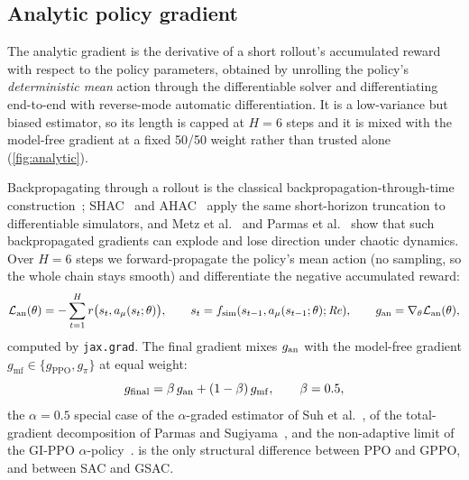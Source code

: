 \subsection{Analytic policy gradient}
\label{sec:analytic}

The analytic gradient is the derivative of a short rollout's accumulated
reward with respect to the policy parameters, obtained by unrolling the
policy's \emph{deterministic mean} action through the differentiable solver
and differentiating end-to-end with reverse-mode automatic differentiation.
It is a low-variance but biased estimator, so its length is capped at
$H=6$ steps and it is mixed with the model-free gradient at a fixed 50/50
weight rather than trusted alone (\cref{fig:analytic}).

Backpropagating through a rollout is the classical
backpropagation-through-time construction~\cite{werbos1990bptt}; SHAC~\cite{shac2022}
and AHAC~\cite{ahac2024} apply the same short-horizon truncation to
differentiable simulators, and Metz et al.~\cite{metz2021} and Parmas et
al.~\cite{parmas2018pipps} show that such backpropagated gradients can
explode and lose direction under chaotic dynamics. Over $H=6$ steps we
forward-propagate the policy's mean action (no sampling, so the whole chain
stays smooth) and differentiate the negative accumulated reward:
\begin{equation}
  \mathcal{L}_{\mathrm{an}}(\theta)=-\sum_{t=1}^{H}r\big(s_t,a_\mu(s_t;\theta)\big),\qquad
  s_t=f_{\mathrm{sim}}(s_{t-1},a_\mu(s_{t-1};\theta);\mathit{Re}),\qquad
  g_{\mathrm{an}}=\nabla_\theta\mathcal{L}_{\mathrm{an}}(\theta),
  \label{eq:analytic}
\end{equation}
computed by \texttt{jax.grad}. The final gradient mixes $g_{\mathrm{an}}$ with the
model-free gradient $g_{\mathrm{mf}}\in\{g_{\mathrm{PPO}},g_\pi\}$ at equal
weight:
\begin{equation}
  g_{\mathrm{final}}=\beta\,g_{\mathrm{an}}+(1-\beta)\,g_{\mathrm{mf}},\qquad \beta=0.5,
  \label{eq:mix}
\end{equation}
the $\alpha=0.5$ special case of the $\alpha$-graded estimator of Suh et
al.~\cite{suh2022}, of the total-gradient decomposition of Parmas and
Sugiyama~\cite{parmas2018total}, and the non-adaptive limit of the GI-PPO
$\alpha$-policy~\cite{gippo2023}.  is the only structural
difference between PPO and GPPO, and between SAC and GSAC.

